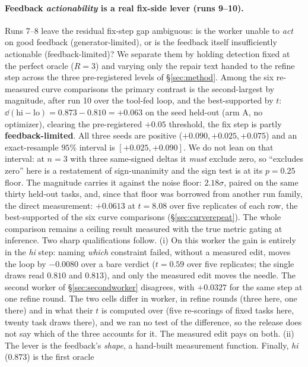 \documentclass[11pt]{article}
\begin{document}
\paragraph{Feedback \emph{actionability} is a real fix-side lever (runs 9--10).} Runs 7--8 leave the residual fix-step gap ambiguous: is
the worker unable to \emph{act} on good feedback (generator-limited), or is the feedback
itself insufficiently actionable (feedback-limited)? We separate them by holding detection
fixed at the perfect oracle ($R{=}3$) and varying only the repair text handed to the refine
step across the three pre-registered levels of \S\ref{sec:method}. Among the six re-measured curve
comparisons the primary contrast is the second-largest by magnitude, after run 10 over the tool-fed
loop, and the best-supported by $t$:
$\dd(\text{hi}-\text{lo}) = 0.873 - 0.810 = +0.063$ on the seed held-out (arm A, no
optimizer), clearing the pre-registered $+0.05$ threshold, the fix step is partly
\textbf{feedback-limited}. All three seeds are positive ($+0.090, +0.025, +0.075$) and an
exact-resample $95\%$ interval is $[+0.025, +0.090]$. We do not lean on that interval:
at $n{=}3$ with three same-signed deltas it \emph{must} exclude zero, so ``excludes zero'' here
is a restatement of sign-unanimity and the sign test is at its $p=0.25$ floor. The magnitude carries it
against the noise floor: $2.18\sigma$, paired on the same thirty held-out tasks,
and, since that floor was borrowed from another run family, the direct
measurement: $+0.0613$ at $t = 8.08$ over five replicates of each row, the best-supported of the six
curve comparisons (\S\ref{sec:curverepeat}). The whole comparison remains a ceiling result measured with the
true metric gating at inference. Two
sharp qualifications follow. (i) On this worker the gain is entirely in the \emph{hi} step:
naming \emph{which} constraint failed, without a measured edit, moves the loop by $-0.0080$ over a
bare verdict ($t = 0.59$ over five replicates; the single draws read $0.810$ and $0.813$), and
only the measured edit moves the needle. The second worker of \S\ref{sec:secondworker} disagrees,
with $+0.0327$ for the same step at one refine round. The two cells differ in worker, in refine
rounds (three here, one there) and in what their $t$ is computed over (five re-scorings of fixed
tasks here, twenty task draws there), and we ran no test of the difference, so the release does
not say which of the three accounts for it. The measured edit pays on both. (ii) The lever is the
feedback's \emph{shape}, a hand-built measurement function. Finally, \emph{hi} ($0.873$) is the first oracle
\end{document}

